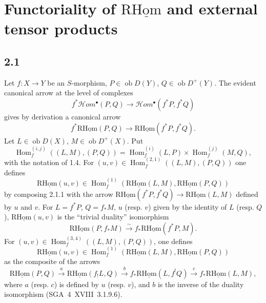 \documentclass[11pt]{article}
\DeclareMathOperator{\Hom}{Hom}
\newcommand{\ob}{\operatorname{ob}}
\providecommand{\Hom}{\operatorname{Hom}}
\providecommand{\ob}{\operatorname{ob}}
\providecommand{\Hom}{\operatorname{Hom}}
\begin{document}
\section{Functoriality of \texorpdfstring{$\mathrm{R}\underline{\mathrm{Hom}}$}{RHom} and external tensor products}

\subsection*{2.1}
Let $f:X\to Y$ be an $S$-morphism, $P\in\ob D(Y)$, $Q\in\ob D^{+}(Y)$. The evident canonical arrow at the level of complexes
\[
f^{*}\mathcal Hom^{\bullet}(P,Q)\longrightarrow\mathcal Hom^{\bullet}(f^{*}P,f^{*}Q)
\]
gives by derivation a canonical arrow
\begin{equation}\tag{2.1.1}
f^{*}\mathrm{R}\underline{\mathrm{Hom}}(P,Q)\longrightarrow\mathrm{R}\underline{\mathrm{Hom}}(f^{*}P,f^{*}Q).
\end{equation}
Let $L\in\ob D(X)$, $M\in\ob D^{+}(X)$. Put
\begin{equation}\tag{2.1.2}
\Hom_f^{(i,j)}((L,M),(P,Q))=\Hom_f^{(i)}(L,P)\times\Hom_f^{(j)}(M,Q),
\end{equation}
with the notation of 1.4. For $(u,v)\in\Hom_f^{(2,1)}((L,M),(P,Q))$ one defines
\begin{equation}\tag{2.1.3}
\mathrm{R}\underline{\mathrm{Hom}}(u,v)\in\Hom_f^{(1)}(\mathrm{R}\underline{\mathrm{Hom}}(L,M),\mathrm{R}\underline{\mathrm{Hom}}(P,Q))
\end{equation}
by composing 2.1.1 with the arrow $\mathrm{R}\underline{\mathrm{Hom}}(f^{*}P,f^{*}Q)\to\mathrm{R}\underline{\mathrm{Hom}}(L,M)$ defined by $u$ and $v$. For $L=f^{*}P$, $Q=f_{*}M$, $u$ (resp. $v$) given by the identity of $L$ (resp. $Q$), $\mathrm{R}\underline{\mathrm{Hom}}(u,v)$ is the ``trivial duality'' isomorphism
\begin{equation}\tag{2.1.4}
\mathrm{R}\underline{\mathrm{Hom}}(P,f_{*}M)\xrightarrow{\sim}f_{*}\mathrm{R}\underline{\mathrm{Hom}}(f^{*}P,M).
\end{equation}
For $(u,v)\in\Hom_f^{(3,4)}((L,M),(P,Q))$, one defines
\begin{equation}\tag{2.1.5}
\mathrm{R}\underline{\mathrm{Hom}}(u,v)\in\Hom_f^{(1)}(\mathrm{R}\underline{\mathrm{Hom}}(L,M),\mathrm{R}\underline{\mathrm{Hom}}(P,Q))
\end{equation}
as the composite of the arrows
\[
\mathrm{R}\underline{\mathrm{Hom}}(P,Q)\xrightarrow{a}\mathrm{R}\underline{\mathrm{Hom}}(f_{!}L,Q)\xrightarrow{b}f_{*}\mathrm{R}\underline{\mathrm{Hom}}(L,f^{!}Q)\xrightarrow{c}f_{*}\mathrm{R}\underline{\mathrm{Hom}}(L,M),
\]
where $a$ (resp. $c$) is defined by $u$ (resp. $v$), and $b$ is the inverse of the duality isomorphism (SGA~4~XVIII~3.1.9.6).
\end{document}

